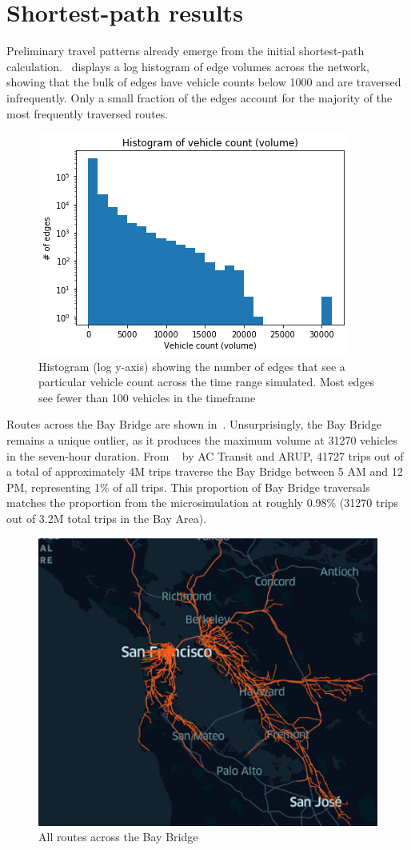 \documentclass[final]{IEEEtran}
\begin{document}
\section{Shortest-path results}
Preliminary travel patterns already emerge from the initial shortest-path calculation.~ displays a log histogram of edge volumes across the network, showing that the bulk of edges have vehicle counts below 1000 and are traversed infrequently. Only a small fraction of the edges account for the majority of the most frequently traversed routes.
\begin{figure} 
    \centering
    \includegraphics[width=.45\textwidth]{figs/vehicle_counts_on_edges_log_y_axis.png}
    \caption{Histogram (log y-axis) showing the number of edges that see a particular vehicle count across the time range simulated. Most edges see fewer than 100 vehicles in the timeframe}
    \label{fig:volume}
\end{figure}
Routes across the Bay Bridge are shown in~. Unsurprisingly, the Bay Bridge remains a unique outlier, as it produces the maximum volume at 31270 vehicles in the seven-hour duration. From ~\cite{actransitBayBridgeCorridor2010} by AC Transit and ARUP, 41727 trips out of a total of approximately 4M trips traverse the Bay Bridge between 5 AM and 12 PM, representing 1\% of all trips. This proportion of Bay Bridge traversals matches the proportion from the microsimulation at roughly 0.98\% (31270 trips out of 3.2M total trips in the Bay Area).



\begin{figure} 
    \includegraphics[width=.45\textwidth]{figs/bay_bridge_trips.png}
    \caption{All routes across the Bay Bridge}
    \label{fig:transbay}
\end{figure}
\end{document}
